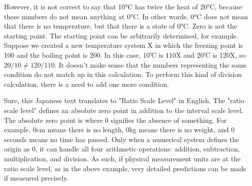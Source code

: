 \documentclass{ltjsbook}
\begin{document}
However, it is not correct to say that 10°C has twice the heat of 20°C, because these numbers do not mean anything at 0°C. In other words, 0°C does not mean that there is no temperature, but that there is a state of 0°C. Zero is not the starting point. The starting point can be arbitrarily determined, for example.
Suppose we created a new temperature system X in which the freezing point is 100 and the boiling point is 200. In this case, 10℃ is 110X and 20℃ is 120X, so $20/10 \neq 120/110$. It doesn't make sense that the numbers representing the same condition do not match up in this calculation. To perform this kind of division calculation, there is a need to add one more condition.

Sure, this Japanese text translates to "Ratio Scale Level" in English.
The "ratio scale level" defines an absolute zero point in addition to the interval scale level. The absolute zero point is where 0 signifies the absence of something. For example, 0cm means there is no length, 0kg means there is no weight, and 0 seconds means no time has passed. Only when a numerical system defines the origin as 0, it can handle all four arithmetic operations: addition, subtraction, multiplication, and division. As such, if physical measurement units are at the ratio scale level, as in the above example, very detailed predictions can be made if measured precisely.
\end{document}
